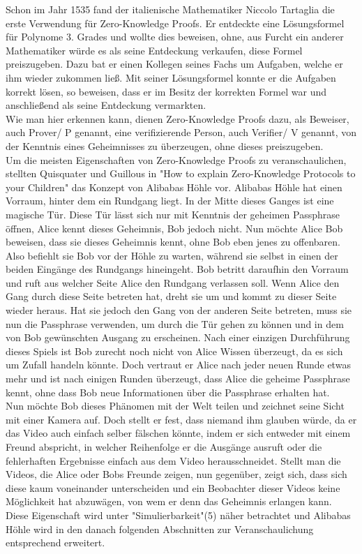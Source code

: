 \documentclass {article}
\begin{document}
Schon im Jahr 1535 fand der italienische Mathematiker Niccolo Tartaglia die erste Verwendung für Zero-Knowledge Proofs\cite{BSW}. Er entdeckte eine Lösungsformel für Polynome 3. Grades und wollte dies beweisen, ohne, aus Furcht ein anderer Mathematiker würde es als seine Entdeckung verkaufen, diese Formel preiszugeben. Dazu bat er einen Kollegen seines Fachs um Aufgaben, welche er ihm wieder zukommen lie\ss{}. Mit seiner L\"osungsformel konnte er die Aufgaben korrekt l\"osen, so beweisen, dass er im Besitz der korrekten Formel war und anschlie\ss{}end als seine Entdeckung vermarkten. \\

Wie man hier erkennen kann, dienen Zero-Knowledge Proofs dazu, als Beweiser, auch Prover/ P genannt, eine
verifizierende Person, auch Verifier/ V genannt, von der Kenntnis eines Geheimnisses zu überzeugen, ohne dieses preiszugeben. \\ 

Um die meisten Eigenschaften von Zero-Knowledge Proofs zu veranschaulichen, stellten Quisquater und Guillous in "How to explain Zero-Knowledge Protocols to your Children"\cite{GQ89} das Konzept von Alibabas H\"ohle vor.
Alibabas H\"ohle hat einen Vorraum, hinter dem ein Rundgang liegt. In der Mitte dieses Ganges ist eine magische T\"ur. Diese T\"ur l\"asst sich nur mit Kenntnis der geheimen Passphrase \"offnen,
Alice kennt dieses Geheimnis, Bob jedoch nicht.
Nun m\"ochte Alice Bob beweisen, dass sie dieses Geheimnis kennt, ohne Bob eben jenes zu offenbaren. Also befiehlt sie Bob vor der H\"ohle zu warten, w\"ahrend sie selbst in einen der beiden Eing\"ange des Rundgangs hineingeht. Bob betritt daraufhin den Vorraum und ruft aus welcher Seite Alice den Rundgang verlassen soll. Wenn Alice den Gang durch diese Seite betreten hat, dreht sie um und kommt zu dieser Seite wieder heraus. Hat sie jedoch den Gang von der anderen Seite betreten, muss sie nun die Passphrase verwenden, um durch die T\"ur gehen zu k\"onnen und in dem von Bob gewünschten Ausgang zu erscheinen. Nach einer einzigen Durchf\"uhrung dieses Spiels ist Bob zurecht noch nicht von Alice Wissen \"uberzeugt, da es sich um Zufall handeln k\"onnte. Doch vertraut er Alice nach jeder neuen Runde etwas mehr und ist nach einigen Runden \"uberzeugt, dass Alice die geheime Passphrase kennt, ohne dass Bob neue Informationen \"uber die Passphrase erhalten hat. \\ 

Nun m\"ochte Bob dieses Ph\"anomen mit der Welt teilen und zeichnet seine Sicht mit einer Kamera auf. Doch stellt er fest, dass niemand ihm glauben würde, da er das Video auch einfach selber f\"alschen k\"onnte, indem er sich entweder mit einem Freund abspricht, in welcher Reihenfolge er die Ausg\"ange ausruft oder die fehlerhaften Ergebnisse einfach aus dem Video herausschneidet. 
Stellt man die Videos, die Alice oder Bobs Freunde zeigen, nun gegen\"uber, zeigt sich, dass sich diese kaum voneinander unterscheiden und ein Beobachter dieser Videos keine M\"oglichkeit hat abzuw\"agen, von wem er denn das Geheimnis erlangen kann.
Diese Eigenschaft wird unter "Simulierbarkeit"(5) n\"aher betrachtet und Alibabas H\"ohle wird in den danach folgenden Abschnitten zur Veranschaulichung entsprechend erweitert.
\end{document}
